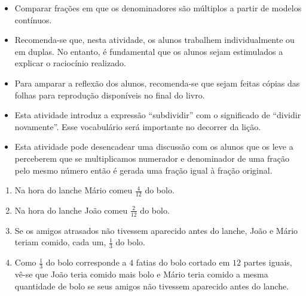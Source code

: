 \begin{atividade}\label{chap4-ativ4}
\objetivos
\begin{itemize} %
    \item       Comparar frações em que os denominadores são múltiplos a
partir de modelos contínuos.
\end{itemize} %

\discussoes
\begin{itemize}
    \item       Recomenda-se que, nesta atividade, os alunos trabalhem
individualmente ou em duplas. No entanto, é fundamental que os alunos sejam
estimulados a explicar o raciocínio realizado.
    \item       Para amparar a reflexão dos alunos, recomenda-se que sejam
feitas cópias das             folhas para reprodução disponíveis no final do
livro.
    \item       Esta atividade introduz a expressão ``subdividir'' com o significado de ``dividir novamente''. Esse vocabulário será importante no decorrer da lição.
    \item       Esta atividade pode desencadear uma discussão com os alunos que
os leve a perceberem que se multiplicamos numerador e denominador de
uma fração pelo mesmo número então é gerada uma fração igual à fração
original.
\end{itemize} %

\solucao
  \begin{enumerate}     
  \item Na hora do lanche Mário comeu $\frac{4}{12}$ do bolo.
  \item Na hora do lanche João comeu   $\frac{2}{12}$ do    bolo.
  \item Se os amigos atrasados não tivessem aparecido antes do lanche, João e Mário teriam comido, cada um,   $\frac{1}{3}$   do bolo.
  \item Como   $\frac{1}{3}$ do bolo corresponde a   $4$   fatias do bolo cortado em   $12$   partes iguais, vê-se que João teria comido mais bolo e Mário teria comido a mesma quantidade de bolo se seus amigos não tivessem aparecido antes do lanche.
  \end{enumerate}

\end{atividade}

\clearpage

